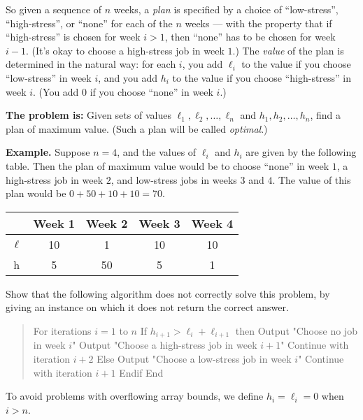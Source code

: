 \documentclass[12pt]{article}
\begin{document}
\begin{enumerate}
So given a sequence of $n$ weeks, a {\em plan} is
specified by a choice of ``low-stress'', ``high-stress'',
or ``none'' for each of the $n$ weeks --- with
the property that if ``high-stress'' is chosen for week $i > 1$,
then ``none'' has to be chosen for week $i-1$.
(It's okay to choose a high-stress job in week $1$.)
The {\em value} of the plan is determined in the natural way:
for each $i$, you add $\ell_i$ to the value if you
choose ``low-stress'' in week $i$,
and you add $h_i$ to the value if you
choose ``high-stress'' in week $i$.
(You add $0$ if you choose ``none'' in week $i$.)

{\bf The problem is:} Given sets of values
$\ell_1, \ell_2, \ldots, \ell_n$ and $h_1, h_2, \ldots, h_n$,
find a plan of maximum value.
(Such a plan will be called {\em optimal}.)

\bigskip
{\bf Example.}  Suppose $n = 4$, and the values of $\ell_i$ and $h_i$
are given by the following table.
Then the plan of maximum value would be to choose
``none'' in week $1$, a high-stress job in week $2$,
and low-stress jobs in weeks $3$ and $4$.
The value of this plan would be $0 + 50 + 10 + 10 = 70$.
\begin{table}[h]
\begin{center}
\begin{tabular}{|c||c|c|c|c|}
\hline & Week 1 & Week 2 & Week 3 & Week 4 \\ \hline
$\ell$ & 10 & 1 & 10 & 10 \\ \hline
h & 5 & 50 & 5 & 1 \\ \hline
\end{tabular}
\end{center}
\end{table}


Show that the following algorithm does not
correctly solve this problem, by giving an instance on which
it does not return the correct answer.
\begin{quote}
\begin{code}
For iterations $i = 1$ to $n$
  If $h_{i+1} > \ell_i + \ell_{i+1}$ then
    Output "Choose no job in week $i$"
    Output "Choose a high-stress job in week $i+1$"
    Continue with iteration $i+2$
  Else
    Output "Choose a low-stress job in week $i$"
    Continue with iteration $i+1$
  Endif
End
\end{code}
\end{quote}
To avoid problems with overflowing array bounds,
we define $h_i = \ell_i = 0$ when $i > n$.


\end{enumerate}
\end{document}
